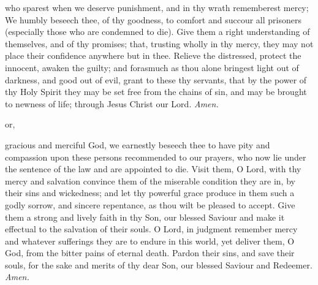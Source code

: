  who sparest when we deserve punishment, and in thy wrath rememberest mercy; We humbly beseech thee, of thy goodness, to comfort and succour all prisoners (especially those who are condemned to die). Give them a right understanding of themselves, and of thy promises; that, trusting wholly in thy mercy, they may not place their confidence anywhere but in thee. Relieve the distressed, protect the innocent, awaken the guilty; and forasmuch as thou alone bringest light out of darkness, and good out of evil, grant to these thy servants, that by the power of thy Holy Spirit they may be set free from the chains of sin, and may be brought to newness of life; through Jesus Christ our Lord. \textit{Amen.}
\begin{inhead}
    or,
\end{inhead}
 gracious and merciful God, we earnestly beseech thee to have pity and compassion upon these persons recommended to our prayers, who now lie under the sentence of the law and are appointed to die. Visit them, O Lord, with thy mercy and salvation convince them of the miserable condition they are in, by their sins and wickedness; and let thy powerful grace produce in them such a godly sorrow, and sincere repentance, as thou wilt be pleased to accept. Give them a strong and lively faith in thy Son, our blessed Saviour and make it effectual to the salvation of their souls. O Lord, in judgment remember mercy and whatever sufferings they are to endure in this world, yet deliver them, O God, from the bitter pains of eternal death. Pardon their sins, and save their souls, for the sake and merits of thy dear Son, our blessed Saviour and Redeemer. \textit{Amen.}



